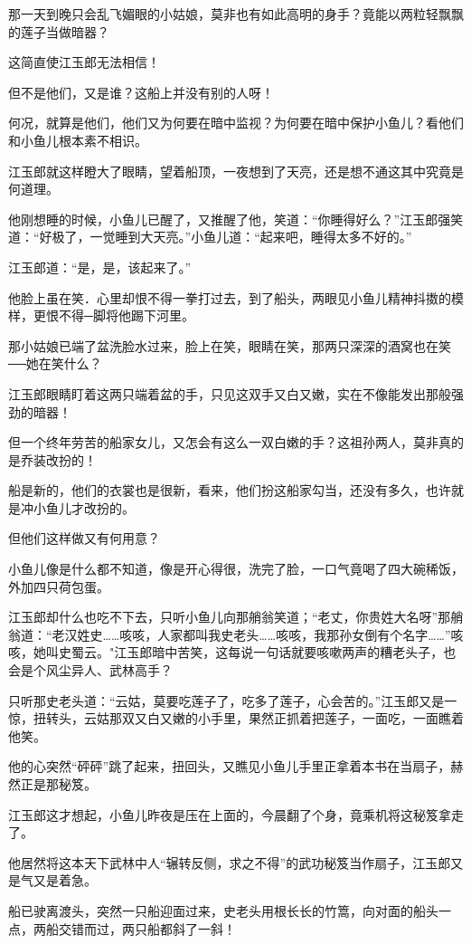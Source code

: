 \documentclass[12pt,oneside]{book}
\begin{document}
那一天到晚只会乱飞媚眼的小姑娘，莫非也有如此高明的身手？竟能以两粒轻飘飘的莲子当做暗器？

这简直使江玉郎无法相信！

但不是他们，又是谁？这船上并没有别的人呀！

何况，就算是他们，他们又为何要在暗中监视？为何要在暗中保护小鱼儿？看他们和小鱼儿根本素不相识。

江玉郎就这样瞪大了眼睛，望着船顶，一夜想到了天亮，还是想不通这其中究竟是何道理。

他刚想睡的时候，小鱼儿已醒了，又推醒了他，笑道：``你睡得好么？''江玉郎强笑道：``好极了，一觉睡到大天亮。''小鱼儿道：``起来吧，睡得太多不好的。''

江玉郎道：``是，是，该起来了。''

他脸上虽在笑．心里却恨不得一拳打过去，到了船头，两眼见小鱼儿精神抖擞的模样，更恨不得─脚将他踢下河里。

那小姑娘已端了盆洗脸水过来，脸上在笑，眼睛在笑，那两只深深的酒窝也在笑──她在笑什么？

江玉郎眼睛盯着这两只端着盆的手，只见这双手又白又嫩，实在不像能发出那般强劲的暗器！

但一个终年劳苦的船家女儿，又怎会有这么一双白嫩的手？这祖孙两人，莫非真的是乔装改扮的！

船是新的，他们的衣裳也是很新，看来，他们扮这船家勾当，还没有多久，也许就是冲小鱼儿才改扮的。

但他们这样做又有何用意？

小鱼儿像是什么都不知道，像是开心得很，洗完了脸，一口气竟喝了四大碗稀饭，外加四只荷包蛋。

江玉郎却什么也吃不下去，只听小鱼儿向那艄翁笑道；``老丈，你贵姓大名呀''那艄翁道：``老汉姓史\ldots\ldots 咳咳，人家都叫我史老头\ldots\ldots 咳咳，我那孙女倒有个名字\ldots\ldots{}''咳咳，她叫史蜀云。"江玉郎暗中苦笑，这每说一句话就要咳嗽两声的糟老头子，也会是个风尘异人、武林高手？

只听那史老头道：``云姑，莫要吃莲子了，吃多了莲子，心会苦的。''江玉郎又是一惊，扭转头，云姑那双又白又嫩的小手里，果然正抓着把莲子，一面吃，一面瞧着他笑。

他的心突然``砰砰''跳了起来，扭回头，又瞧见小鱼儿手里正拿着本书在当扇子，赫然正是那秘笈。

江玉郎这才想起，小鱼儿昨夜是压在上面的，今晨翻了个身，竟乘机将这秘笈拿走了。

他居然将这本天下武林中人``辗转反侧，求之不得''的武功秘笈当作扇子，江玉郎又是气又是着急。

船已驶离渡头，突然一只船迎面过来，史老头用根长长的竹篙，向对面的船头一点，两船交错而过，两只船都斜了一斜！
\end{document}
